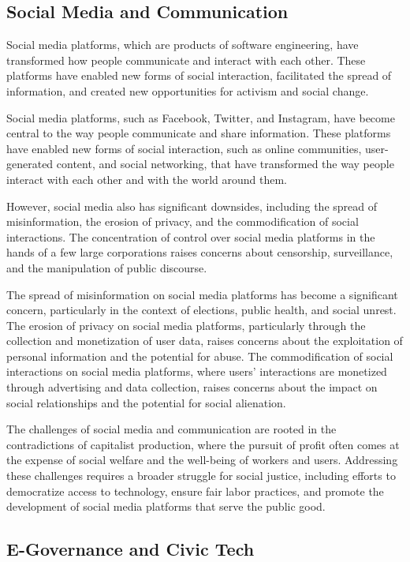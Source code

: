 \begin{refsection}
\begin{multicols}{2}
{\subsection{Social Media and Communication}

Social media platforms, which are products of software engineering, have transformed how people communicate and interact with each other. These platforms have enabled new forms of social interaction, facilitated the spread of information, and created new opportunities for activism and social change.

Social media platforms, such as Facebook, Twitter, and Instagram, have become central to the way people communicate and share information. These platforms have enabled new forms of social interaction, such as online communities, user-generated content, and social networking, that have transformed the way people interact with each other and with the world around them.

However, social media also has significant downsides, including the spread of misinformation, the erosion of privacy, and the commodification of social interactions. The concentration of control over social media platforms in the hands of a few large corporations raises concerns about censorship, surveillance, and the manipulation of public discourse.

The spread of misinformation on social media platforms has become a significant concern, particularly in the context of elections, public health, and social unrest. The erosion of privacy on social media platforms, particularly through the collection and monetization of user data, raises concerns about the exploitation of personal information and the potential for abuse. The commodification of social interactions on social media platforms, where users' interactions are monetized through advertising and data collection, raises concerns about the impact on social relationships and the potential for social alienation.

The challenges of social media and communication are rooted in the contradictions of capitalist production, where the pursuit of profit often comes at the expense of social welfare and the well-being of workers and users. Addressing these challenges requires a broader struggle for social justice, including efforts to democratize access to technology, ensure fair labor practices, and promote the development of social media platforms that serve the public good.

\subsection{E-Governance and Civic Tech}

}
\end{multicols}
\end{refsection}
